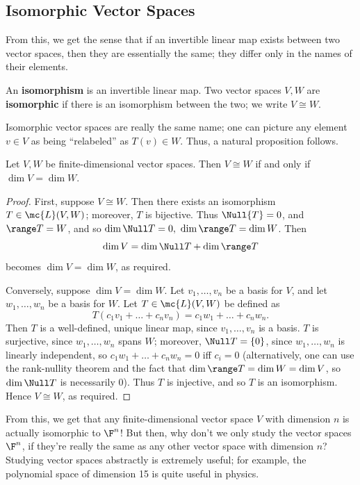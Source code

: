 \documentclass[math0540-lecture-notes.tex]{subfiles}
\begin{document}
\subsection{Isomorphic Vector Spaces}

From this, we get the sense that if an invertible linear map exists between two vector spaces, then
they are essentially the same; they differ only in the names of their elements.

\begin{definition}{}
  An \textbf{isomorphism} is an invertible linear map. Two vector spaces $V,W$ are
  \textbf{isomorphic} if there is an isomorphism between the two; we write $V\cong W$.
\end{definition}

Isomorphic vector spaces are really the same name; one can picture any element $v\in V$ as being
``relabeled'' as $T(v)\in W$. Thus, a natural proposition follows.
\begin{theorem}{}
  Let $V,W$ be finite-dimensional vector spaces. Then $V\cong W$ if and only if $\dim V = \dim W$.
\end{theorem}
\begin{proof}[Proof]
  First, suppose $V\cong W$. Then there exists an isomorphism $T\in \mc{L}(V,W)$; moreover, $T$ is
  bijective. Thus $ \Null{T}=0$, and $\range T = W$, and so $\dim\Null T = 0,\ \dim \range T
  =\dim W$. Then \[
    \dim V = \dim\Null T + \dim\range T
  \] becomes $\dim V = \dim W$, as required.

  Conversely, suppose $\dim V = \dim W$. Let $v_1,\ldots,v_n$ be a basis for $V$, and let $
   w_1,\ldots,w_n$ be a basis for $W$. Let $T\in \mc{L}(V,W)$ be defined as \[
     T(c_1v_1+\ldots+c_nv_n)=c_1w_1+\ldots+c_nw_n
   .\] Then $T$ is a well-defined, unique linear map, since $v_1,\ldots,v_n$ is a basis. $T$ is
   surjective, since $w_1,\ldots,w_n$ spans $W$; moreover, $ \Null T=\{ 0 \}$, since
   $w_1,\ldots,w_n$ is linearly independent, so $ c_1w_1+\ldots+c_nw_n=0$ iff $c_i=0$
   (alternatively, one can use the rank-nullity theorem and the fact that $\dim\range T = \dim W =
   \dim V$, so $\dim\Null T$ is necessarily $0$). Thus $T$ is injective, and so $T$ is an
   isomorphism. Hence $V\cong W$, as required.
\end{proof}

From this, we get that any finite-dimensional vector space $V$ with dimension $n$ is actually
isomorphic to $\F^{n}$! But then, why don't we only study the vector spaces $\F^{n}$, if they're
really the same as any other vector space with dimension $n$? Studying vector spaces abstractly is
extremely useful; for example, the polynomial space of dimension 15 is quite useful in physics.
\end{document}
